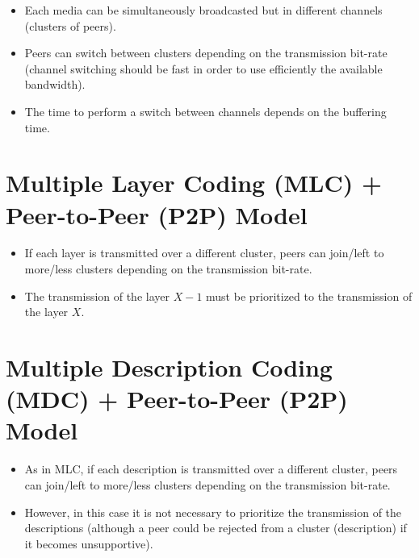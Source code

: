 \begin{itemize}
\item Each media can be simultaneously broadcasted but in different
  channels (clusters of peers).
\item Peers can switch between clusters depending on the transmission
  bit-rate (channel switching should be fast in order to use
  efficiently the available bandwidth).
\item The time to perform a switch between channels depends on the
  buffering time.
\end{itemize}


\section{Multiple Layer Coding (MLC) + Peer-to-Peer (P2P) Model}

\begin{itemize}
\item If each layer is transmitted over a different cluster, peers can
  join/left to more/less clusters depending on the transmission
  bit-rate.
\item The transmission of the layer $X-1$ must be prioritized to the
  transmission of the layer $X$.
\end{itemize}


\section{Multiple Description Coding (MDC) + Peer-to-Peer (P2P) Model}

\begin{itemize}
\item As in MLC, if each description is transmitted over a different
  cluster, peers can join/left to more/less clusters depending on the
  transmission bit-rate.
\item However, in this case it is not necessary to prioritize the
  transmission of the descriptions (although a peer could be rejected
  from a cluster (description) if it becomes unsupportive).
\end{itemize}


